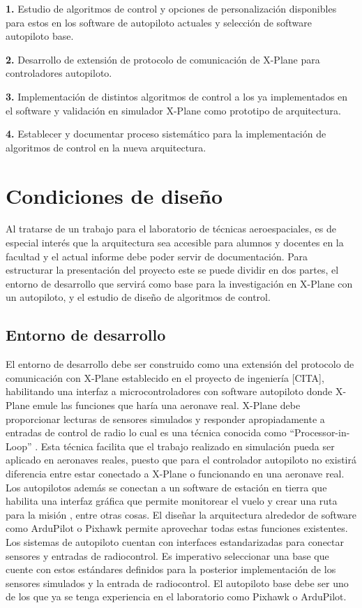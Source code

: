 \textbf{1.} Estudio de algoritmos de control y opciones de personalización disponibles para estos en los software de autopiloto actuales y selección de software autopiloto base.

\textbf{2.} Desarrollo de extensión de protocolo de comunicación de X-Plane para controladores autopiloto.

\textbf{3.} Implementación de distintos algoritmos de control a los ya implementados en el software y validación en simulador X-Plane como prototipo de arquitectura.

\textbf{4.} Establecer y documentar proceso sistemático para la implementación de algoritmos de control en la nueva arquitectura.

\section{Condiciones de diseño}

Al tratarse de un trabajo para el laboratorio de técnicas aeroespaciales, es de especial interés que la arquitectura sea accesible para alumnos y docentes en la facultad y el actual informe debe poder servir de documentación. Para estructurar la presentación del proyecto este se puede dividir en dos partes, el entorno de desarrollo que servirá como base para la investigación en X-Plane con un autopiloto, y el estudio de diseño de algoritmos de control.

\subsection{Entorno de desarrollo}

El entorno de desarrollo debe ser construido como una extensión del protocolo de comunicación con X-Plane establecido en el proyecto de ingeniería [CITA], habilitando una interfaz a microcontroladores con software autopiloto donde X-Plane emule las funciones que haría una aeronave real. X-Plane debe proporcionar lecturas de sensores simulados y responder apropiadamente a entradas de control de radio lo cual es una técnica conocida como ``Processor-in-Loop'' \cite{pil}. Esta técnica facilita que el trabajo realizado en simulación pueda ser aplicado en aeronaves reales, puesto que para el controlador autopiloto no existirá diferencia entre estar conectado a X-Plane o funcionando en una aeronave real. Los autopilotos además se conectan a un software de estación en tierra que habilita una interfaz gráfica que permite monitorear el vuelo y crear una ruta para la misión \cite{ardupilot-gs}, entre otras cosas. El diseñar la arquitectura alrededor de software como ArduPilot o Pixhawk permite aprovechar todas estas funciones existentes. Los sistemas de autopiloto cuentan con interfaces estandarizadas para conectar sensores y entradas de radiocontrol. Es imperativo seleccionar una base que cuente con estos estándares definidos para la posterior implementación de los sensores simulados y la entrada de radiocontrol. El autopiloto base debe ser uno de los que ya se tenga experiencia en el laboratorio como Pixhawk o ArduPilot.

